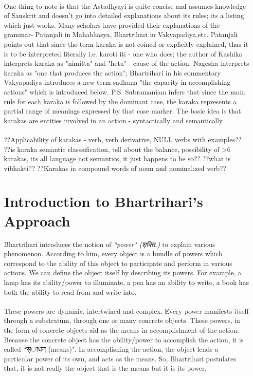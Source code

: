 \documentclass[a4paper,10pt]{article}
\begin{document}
\paragraph{} \color{black!100}One thing to note is that the Astadhyayi is quite concise and assumes knowledge of Sanskrit and doesn't go into detailed explanations about its rules; its a listing which just works. Many scholars have provided their explanations of the grammar- Patanjali in Mahabhasya, Bhartrihari in Vakyapadiya,etc. Patanjali points out that since the term karaka is not coined or explicitly explained, thus it is to be interpreted literally i.e. karoti iti - one who does; the author of Kashika interprets karaka as "nimitta" and "hetu" - cause of the action; Nagesha interprets karaka as "one that produces the action"; Bhartrihari in his commentary Vakyapadiya introduces a new term sadhana "the capacity in accomplishing actions" which is introduced below. P.S. Subramaniam infers that since the main rule for each karaka is followed by the dominant case, the karaka represents a partial range of meanings expressed by that case marker. The basic idea is that karakas are entities involved in an action - syntactically and semantically.
\paragraph{}
??Applicability of karakas - verb, verb derivative, NULL verbs with examples??
??is karaka semantic classsification, tell about the balance, possibility of >6 karakas, its all language not semantics, it just happens to be so??
??what is vibhakti??
??Karakas in compound words of noun and nominalized verb??
\newpage
\section{Introduction to Bhartrihari's Approach}

Bhartrihari introduces the notion of \textit{``power" ({\d शक्ति.})} to explain various phenomenon. 
According to him, every object is a bundle of powers which correspond to the ability of this object to participate and perform in various actions. 
We can define the object itself by describing its powers. For example, a lamp has its ability/power to illuminate, a pen has an ability to write,
a book has both the ability to read from and write into.

\paragraph{} These powers are dynamic, intertwined and complex. Every power manifests itself through a substratum, through one or many concrete objects. 
These powers, in the form of concrete objects aid as the means in accomplishment of the action. Because the concrete object has the ability/power 
to accomplish the action, it is called ``{\d साधन्} (means)".
In accomplishing the action, the object lends a particular power of its own, and acts as the means. So, Bhartrihari postulates that, it is not really the object that is the means but it is its power.
\end{document}
